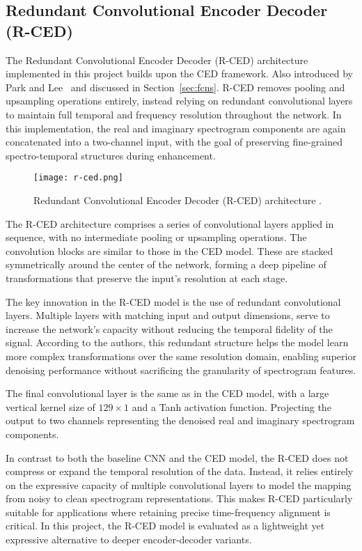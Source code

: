 \subsection{Redundant Convolutional Encoder Decoder (R-CED)}
\label{sec:rced}

The Redundant Convolutional Encoder Decoder (R-CED) architecture implemented in this project builds upon the CED framework. Also introduced by Park and Lee~\cite{park2017acoustic} and discussed in Section~\ref{sec:fcns}. R-CED removes pooling and upsampling operations entirely, instead relying on redundant convolutional layers to maintain full temporal and frequency resolution throughout the network. In this implementation, the real and imaginary spectrogram components are again concatenated into a two-channel input, with the goal of preserving fine-grained spectro-temporal structures during enhancement.

\begin{figure}[h]
    \centering
    \texttt{[image: r-ced.png]}
    \caption{\label{fig:rced}Redundant Convolutional Encoder Decoder (R-CED) architecture \cite{park2017acoustic}.}
\end{figure}

The R-CED architecture comprises a series of convolutional layers applied in sequence, with no intermediate pooling or upsampling operations. The convolution blocks are similar to those in the CED model. These are stacked symmetrically around the center of the network, forming a deep pipeline of transformations that preserve the input’s resolution at each stage.

The key innovation in the R-CED model is the use of redundant convolutional layers. Multiple layers with matching input and output dimensions, serve to increase the network’s capacity without reducing the temporal fidelity of the signal. According to the authors, this redundant structure helps the model learn more complex transformations over the same resolution domain, enabling superior denoising performance without sacrificing the granularity of spectrogram features.

The final convolutional layer is the same as in the CED model, with a large vertical kernel size of \(129 \times 1\) and a Tanh activation function. Projecting the output to two channels representing the denoised real and imaginary spectrogram components.

In contrast to both the baseline CNN and the CED model, the R-CED does not compress or expand the temporal resolution of the data. Instead, it relies entirely on the expressive capacity of multiple convolutional layers to model the mapping from noisy to clean spectrogram representations. This makes R-CED particularly suitable for applications where retaining precise time-frequency alignment is critical. In this project, the R-CED model is evaluated as a lightweight yet expressive alternative to deeper encoder-decoder variants.

